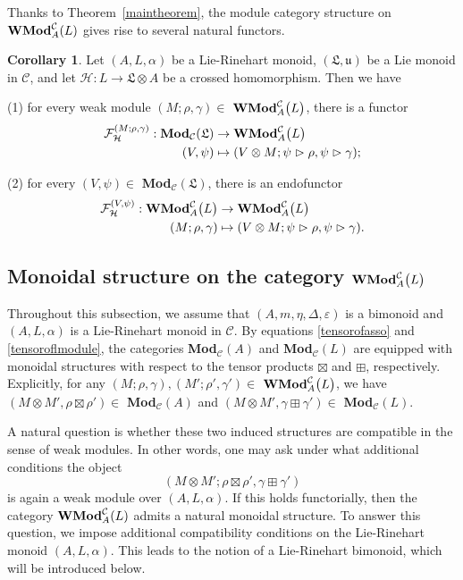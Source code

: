 \documentclass[11pt]{amsart}
\newcommand{\calC}{\mathcal{C}}
\theoremstyle{definition}
\newtheorem{coro}[theo]{Corollary}
\numberwithin{equation}{section}
\begin{document}
Thanks to Theorem~\ref{maintheorem}, the module category structure on ${\bf WMod}^{\mathcal C}_A(L)$ gives rise to several natural functors.
		
\begin{coro}
Let $(A,L,\alpha)$ be a Lie-Rinehart monoid,   $(\mathfrak{L}, \mathfrak{u})$ be a Lie monoid in $\calC$, and let $\mathcal{H}: L \rightarrow \mathfrak{L}\otimes A$ be a crossed homomorphism. Then we have

(1) for every weak module $(M; \rho,\gamma) \in$ ${\bf WMod}^{\calC}_A{\big(L\big)}$, there is a functor 
\begin{align*}
\mathcal{F}_{\mathcal{H}}^{(M;\rho,\gamma)}: \mathrm{ \bf Mod}_{\calC}(\mathfrak{L})  &\rightarrow {\bf WMod}^{\calC}_A{\big(L\big)} \\
(V,\psi) & \mapsto (V\otimes M; \psi \vartriangleright \rho, \psi \vartriangleright \gamma );
\end{align*}

(2) for every $(V,\psi)\in$ {\bf Mod}$_{\calC}(\mathfrak{L})$, there is an endofunctor 
\begin{align*}
\mathcal{F}_{\mathcal{H}}^{(V,\psi)}: {\bf WMod}^{\calC}_A{\big(L\big)}  &\rightarrow {\bf WMod}^{\calC}_A{\big(L\big)} \\
(M;\rho,\gamma) & \mapsto (V\otimes M; \psi \vartriangleright \rho, \psi \vartriangleright \gamma ).
\end{align*}
\end{coro}


\subsection{Monoidal structure on the category ${\bf WMod}^{\calC}_A{\big(L\big)}$ }
Throughout this subsection, we assume that $(A,m,\eta,\Delta,\varepsilon)$ is a bimonoid and $(A,L,\alpha)$ is a Lie-Rinehart monoid in $\calC$. 
By equations \eqref{tensorofasso} and \eqref{tensoroflmodule}, the categories {\bf Mod}$_{\calC}(A)$ and {\bf Mod}$_{\calC}(L)$ are equipped with monoidal structures with respect to the tensor products $\boxtimes$ and $\boxplus$, respectively. Explicitly, for any $(M;\rho,\gamma), (M';\rho',\gamma') \in$ ${\bf WMod}^{\calC}_A{\big(L\big)}$, we have $(M\otimes M', \rho \boxtimes \rho') \in$ {\bf Mod}$_{\calC}(A)$ and $(M\otimes M', \gamma \boxplus \gamma' ) \in$ {\bf Mod}$_{\calC}(L)$. 
		
A natural question is whether these two induced structures are compatible in the sense of weak modules. In other words, one may ask under what additional conditions the object
\[
(M\otimes M';\rho\boxtimes \rho',\gamma\boxplus \gamma')
\]
is again a weak module over $(A,L,\alpha)$. If this holds functorially, then
the category ${\bf WMod}^{\mathcal C}_A(L)$ admits a natural monoidal structure. To answer this question, we impose additional compatibility conditions on the Lie-Rinehart monoid $(A,L,\alpha)$. This leads to the notion of a
Lie-Rinehart bimonoid, which will be introduced below.
		
\end{document}
